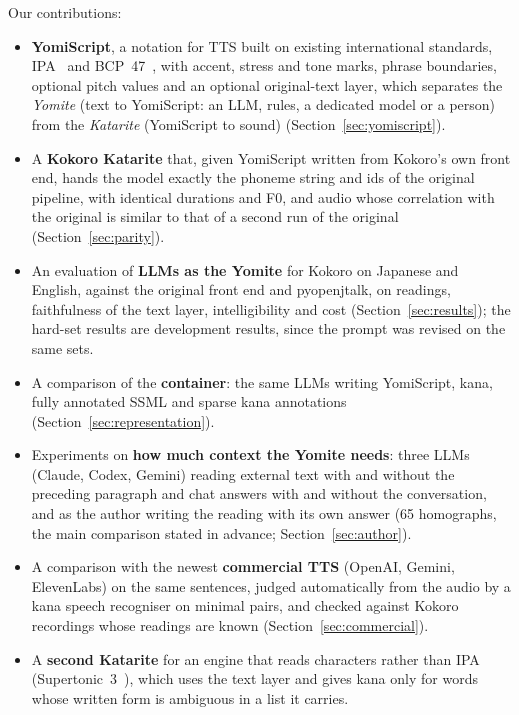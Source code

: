 \documentclass[11pt,a4paper]{article}
\begin{document}
Our contributions:
\begin{itemize}
  \item \textbf{YomiScript}, a notation for TTS built on existing international standards, IPA~\citep{ipa1999handbook}
  and BCP~47~\citep{rfc5646}, with accent, stress and tone
  marks, phrase boundaries, optional pitch values and an optional original-text layer, which separates the
  \emph{Yomite} (text to YomiScript: an LLM, rules, a dedicated model or a person) from the \emph{Katarite}
  (YomiScript to sound) (Section~\ref{sec:yomiscript}).
  \item A \textbf{Kokoro Katarite} that, given YomiScript written from Kokoro's own front end, hands the model exactly
  the phoneme string and ids of the original pipeline, with identical durations and F0, and audio whose correlation
  with the original is similar to that of a second run of the original (Section~\ref{sec:parity}).
  \item An evaluation of \textbf{LLMs as the Yomite} for Kokoro on Japanese and English, against the original front
  end and pyopenjtalk, on readings, faithfulness of the text layer, intelligibility and cost
  (Section~\ref{sec:results}); the hard-set results are development results, since the prompt was revised on the same
  sets.
  \item A comparison of the \textbf{container}: the same LLMs writing YomiScript, kana, fully annotated SSML and
  sparse kana annotations (Section~\ref{sec:representation}).
  \item Experiments on \textbf{how much context the Yomite needs}: three LLMs (Claude, Codex, Gemini) reading external
  text with and without the preceding paragraph and chat answers with and without the conversation, and as the
  author writing the reading with its own answer (65 homographs, the main comparison stated in advance;
  Section~\ref{sec:author}).
  \item A comparison with the newest \textbf{commercial TTS} (OpenAI, Gemini, ElevenLabs) on the same sentences, judged
  automatically from the audio by a kana speech recogniser on minimal pairs, and checked against Kokoro recordings
  whose readings are known (Section~\ref{sec:commercial}).
  \item A \textbf{second Katarite} for an engine that reads characters rather than IPA (Supertonic~3~\citep{supertonic3}),
  which uses the text layer and gives kana only for words whose written form is ambiguous in a list it carries.
\end{itemize}
\end{document}
